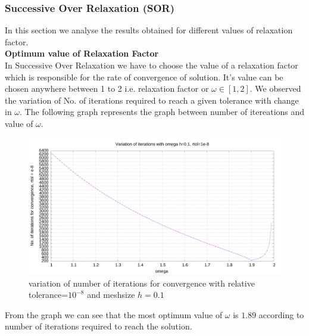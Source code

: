 \subsubsection{Successive Over Relaxation (SOR)}
In this section we analyse the results obtained for different values of relaxation factor. \\[2mm]
\noindent
\textbf{ Optimum value of Relaxation Factor } \\
In Successive Over Relaxation we have to choose the value of a relaxation factor which is responsible for the rate of convergence of solution. It's value can be chosen anywhere between 1 to 2 i.e. relaxation factor or $\omega  \in [1,2]$. We observed the variation of No. of iterations required to reach a given tolerance with change in $ \omega $. The following graph represents the graph between number of itereations and value of $\omega$. \\
\begin{figure}[ht]
    \centering
    \includegraphics[width=\textwidth]{content/graphs/omega.png}
    \caption{variation of number of iterations for convergence with relative tolerance=$10^{-8}$ and meshsize $h = 0.1$  }
    \label{omega variation}
\end{figure}
From the graph we can see that the most optimum value of $ \omega $ is $1.89$ according to number of iterations required to reach the solution.

